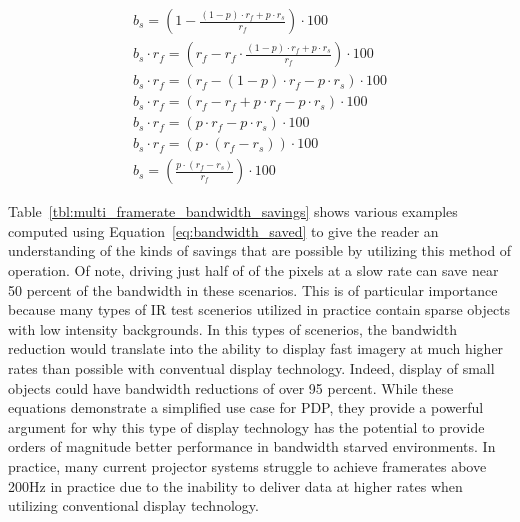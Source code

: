     \begin{equation}
        \begin{array}{ l }
            \displaystyle b_s=\left(1-\frac{(1-p)\cdot r_f + p\cdot r_s}{r_f}\right)\cdot 100 \\[16pt]
            \displaystyle b_s \cdot r_f=\left(r_f-r_f \cdot \frac{(1-p)\cdot r_f + p\cdot r_s}{r_f}\right)\cdot 100 \\[13pt]
            \displaystyle b_s \cdot r_f= (r_f - (1-p)\cdot r_f - p\cdot r_s)\cdot 100 \\[13pt]
            \displaystyle b_s \cdot r_f= (r_f - r_f + p \cdot r_f - p\cdot r_s)\cdot 100 \\[13pt]
            \displaystyle b_s \cdot r_f= (p \cdot r_f - p\cdot r_s)\cdot 100 \\[13pt]
            \displaystyle b_s \cdot r_f= (p \cdot (r_f - r_s))\cdot 100 \\[13pt]
            \displaystyle b_s=\left(\frac{p \cdot (r_f-r_s)}{r_f}\right)\cdot 100
        \end{array}
        \label{eq:bandwidth_saved}
    \end{equation}

    Table~\ref{tbl:multi_framerate_bandwidth_savings} shows various examples computed using Equation~\eqref{eq:bandwidth_saved} to give the reader an understanding of the kinds of savings that are possible by utilizing this method of operation. Of note, driving just half of of the pixels at a slow rate can save near 50 percent of the bandwidth in these scenarios. This is of particular importance because many types of IR test scenerios utilized in practice contain sparse objects with low intensity backgrounds. In this types of scenerios, the bandwidth reduction would translate into the ability to display fast imagery at much higher rates than possible with conventual display technology. Indeed, display of small objects could have bandwidth reductions of over 95 percent. While these equations demonstrate a simplified use case for PDP, they provide a powerful argument for why this type of display technology has the potential to provide orders of magnitude better performance in bandwidth starved environments. In practice, many current projector systems struggle to achieve framerates above 200Hz in practice due to the inability to deliver data at higher rates when utilizing conventional display technology.

